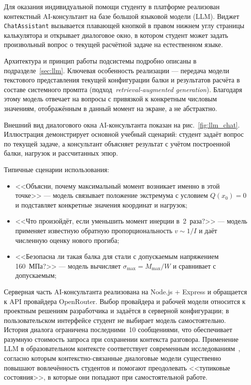 Для оказания индивидуальной помощи студенту в платформе реализован контекстный AI-консультант на базе большой языковой модели (LLM). Виджет \texttt{ChatAssistant} вызывается плавающей кнопкой в правом нижнем углу страницы калькулятора и открывает диалоговое окно, в котором студент может задать произвольный вопрос о текущей расчётной задаче на естественном языке.

Архитектура и принцип работы подсистемы подробно описаны в подразделе~\ref{sec:llm}. Ключевая особенность реализации --- передача модели текстового представления текущей конфигурации балки и результатов расчёта в составе системного промпта (подход~\textit{retrieval-augmented generation}). Благодаря этому модель отвечает на вопросы с привязкой к конкретным числовым значениям, отображённым в данный момент на экране, а не абстрактно.

Внешний вид диалогового окна AI-консультанта показан на рис.~\ref{fig:llm_chat}. Иллюстрация демонстрирует основной учебный сценарий: студент задаёт вопрос по текущей задаче, а консультант объясняет результат с учётом построенной балки, нагрузок и рассчитанных эпюр.

Типичные сценарии использования:
\begin{itemize}
  \item <<Объясни, почему максимальный момент возникает именно в этой точке>> --- модель связывает положение экстремума с условием $Q(x_0) = 0$ и подставляет конкретные значения координат и нагрузок;
  \item <<Что произойдёт, если уменьшить момент инерции в~2~раза?>> --- модель применяет известную обратную пропорциональность $v \sim 1/I$ и даёт численную оценку нового прогиба;
  \item <<Безопасна ли такая балка для стали с допускаемым напряжением 160~МПа?>> --- модель вычисляет $\sigma_{\max} = M_{\max} / W$ и сравнивает с допускаемым;
\end{itemize}

Серверная часть AI-консультанта реализована на Node.js + Express и обращается к API провайдера OpenRouter. Выбор провайдера и рабочей модели относится к проектным решениям разработчика и задаётся в серверной конфигурации; в пользовательском интерфейсе студент не выбирает модель самостоятельно. История диалога ограничена последними~10 сообщениями, что обеспечивает разумную стоимость запроса при сохранении контекста разговора. Применение LLM в образовательном контексте соответствует современным исследованиям~\cite{kasneci2023chatgpt}, согласно которым контекстно-связанные диалоговые модели существенно повышают вовлечённость студентов и помогают преодолевать <<тупиковые состояния>>, в которые они попадают при самостоятельной работе.

